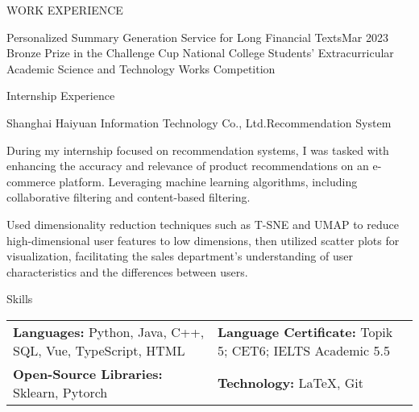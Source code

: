 \documentclass{resume} %
\begin{document}
\begin{rSection}{WORK EXPERIENCE}
\begin{rSubsection}{Personalized Summary Generation Service for Long Financial Texts}{Mar 2023 }{Bronze Prize in the Challenge Cup National College Students' Extracurricular Academic Science and Technology Works Competition}{}
  \end{rSubsection}



\end{rSection}


\begin{rSection}{Internship Experience}

\begin{rSubsection}{Shanghai Haiyuan Information Technology Co., Ltd.}{Recommendation System}{}
  \item 
During my internship focused on recommendation systems, I was tasked with enhancing the accuracy and relevance of product recommendations on an e-commerce platform. Leveraging machine learning algorithms, including collaborative filtering and content-based filtering. 
  \item 
Used dimensionality reduction techniques such as T-SNE and UMAP to reduce high-dimensional user features to low dimensions, then utilized scatter plots for visualization, facilitating the sales department's understanding of user characteristics and the differences between users.
\end{rSubsection}
\end{rSection}

\begin{rSection}{Skills}

\item 
\noindent\begin{tabular}{m{8.5cm} m{8.9cm}}
\textbf{Languages:} Python, Java, C++, SQL, Vue, TypeScript, HTML &
\textbf{Language Certificate:} Topik 5; CET6; IELTS Academic 5.5 \\
\textbf{Open-Source Libraries:}  Sklearn, Pytorch &
\textbf{Technology:} \LaTeX, Git \\
\end{tabular}

\end{rSection}
\end{document}
